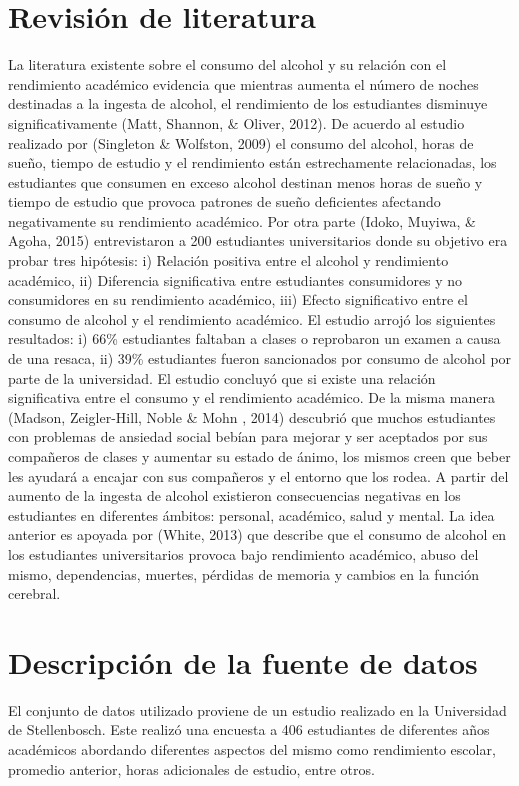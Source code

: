 \documentclass[a4paper,12pt]{article}
\begin{document}
\section{Revisión de literatura}
La literatura existente sobre el consumo del alcohol y su relación con el rendimiento académico evidencia que mientras aumenta el número de noches destinadas a la ingesta de alcohol, el rendimiento de los estudiantes disminuye significativamente (Matt, Shannon, \& Oliver, 2012). De acuerdo al estudio realizado por (Singleton \& Wolfston, 2009) el consumo del alcohol, horas de sueño, tiempo de estudio y el rendimiento están estrechamente relacionadas, los estudiantes que consumen en exceso alcohol destinan menos horas de sueño y tiempo de estudio que provoca patrones de sueño deficientes afectando negativamente su rendimiento académico. Por otra parte (Idoko, Muyiwa, \& Agoha, 2015) entrevistaron a 200 estudiantes universitarios donde su objetivo era probar tres hipótesis: i) Relación positiva entre el alcohol y rendimiento académico, ii) Diferencia significativa entre estudiantes consumidores y no consumidores en su rendimiento académico, iii) Efecto significativo entre el consumo de alcohol y el rendimiento académico. El estudio arrojó los siguientes resultados: i) 66\% estudiantes faltaban a clases o reprobaron un examen a causa de una resaca, ii) 39\% estudiantes fueron sancionados por consumo de alcohol por parte de la universidad.  El estudio concluyó que si existe una relación significativa entre el consumo y el rendimiento académico. De la misma manera (Madson, Zeigler-Hill, Noble \& Mohn , 2014) descubrió que muchos estudiantes con problemas de ansiedad social bebían para mejorar y ser aceptados por sus compañeros de clases y aumentar su estado de ánimo, los mismos creen que beber les ayudará a encajar con sus compañeros y el entorno que los rodea. A partir del aumento de la ingesta de alcohol existieron consecuencias negativas en los estudiantes en diferentes ámbitos: personal, académico, salud y mental. La idea anterior es apoyada por (White, 2013) que describe que el consumo de alcohol en los estudiantes universitarios provoca bajo rendimiento académico, abuso del mismo, dependencias, muertes, pérdidas de memoria y cambios en la función cerebral.

\section{Descripción de la fuente de datos}
El conjunto de datos utilizado proviene de un estudio realizado en la Universidad de Stellenbosch. Este realizó una encuesta a 406 estudiantes de diferentes años académicos abordando diferentes aspectos del mismo como  rendimiento escolar, promedio anterior, horas adicionales de estudio, entre otros.
\end{document}
